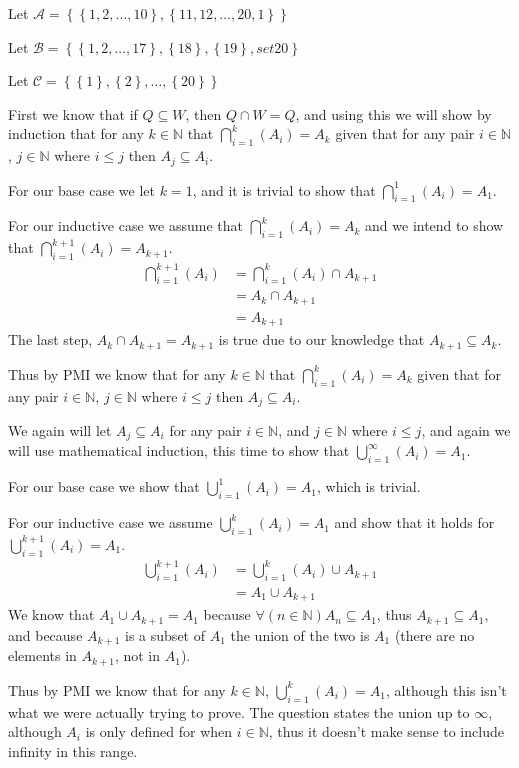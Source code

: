 \documentclass{article}
\let\union\cup
\let\inter\cap
\let\bigunion\bigcup
\let\biginter\bigcap
\newcommand{\unionfrom}[3]{\bigunion\limits_{#1}^{#2} \left( {#3 } \right)}
\newcommand{\interfrom}[3]{\biginter\limits_{#1}^{#2} \left( {#3 } \right)}
\newcommand{\set}[1]{\left\{ {#1} \right\}}
\begin{document}
Let $\mathscr A = \set{ \set{1, 2, \ldots, 10 }, \set{11, 12, \ldots, 20, 1}}$
\medskip

Let $\mathscr B = \set{ \set{1, 2, \ldots, 17}, \set{18}, \set{19}, set{20} }$
\medskip

Let $\mathscr C = \set{ \set1, \set2, \ldots, \set{20} }$
\bigskip

First we know that if $Q \subseteq W$, then $Q \inter W = Q$, and using this we will show by induction that for any $k \in \mathbb N$ that $\interfrom{i=1}k{A_i}=A_k$ given that for any pair $i\in\mathbb N$, $j\in\mathbb N$ where $i\le j$ then $A_j \subseteq A_i$.

For our base case we let $k=1$, and it is trivial to show that $\interfrom{i=1}1{A_i}=A_1$.

For our inductive case we assume that $\interfrom{i=1}{k}{A_i}=A_{k}$ and we intend to show that $\interfrom{i=1}{k+1}{A_i}=A_{k+1}$.
\begin{align*}
\interfrom{i=1}{k+1}{A_i} &= \interfrom{i=1}{k}{A_i} \inter A_{k+1} \\
&= A_k \inter A_{k+1} \\
&= A_{k+1}
\end{align*}
The last step,  $A_k \inter A_{k+1} = A_{k+1}$ is true due to our knowledge that $A_{k+1} \subseteq A_k$.

Thus by PMI we know that for any $k \in \mathbb N$ that $\interfrom{i=1}k{A_i}=A_k$ given that for any pair $i\in\mathbb N$, $j\in\mathbb N$ where $i\le j$ then $A_j \subseteq A_i$.
\medskip

We again will let $A_j \subseteq A_i$ for any pair $i\in\mathbb N$, and $j\in\mathbb N$ where $i\le j$, and again we will use mathematical induction, this time to show that $\unionfrom{i=1}\infty{A_i}=A_1$.

For our base case we show that $\unionfrom{i=1}1{A_i}=A_1$, which is trivial.

For our inductive case we assume $\unionfrom{i=1}k{A_i}=A_1$ and show that it holds for $\unionfrom{i=1}{k+1}{A_i}=A_1$.
\begin{align*}
\unionfrom{i=1}{k+1}{A_i} &= \unionfrom{i=1}k{A_i} \union A_{k+1} \\
&= A_1 \union A_{k+1}
\end{align*}
We know that $ A_1 \union A_{k+1}=A_1$ because $\forall (n \in \mathbb N) A_n \subseteq A_1$, thus $A_{k+1}\subseteq A_1$, and because $A_{k+1}$ is a subset of $A_1$ the union of the two is $A_1$ (there are no elements in $A_{k+1}$, not in $A_1$).

Thus by PMI we know that for any $k\in\mathbb N$, $\unionfrom{i=1}k{A_i}=A_1$, although this isn't what we were actually trying to prove. The question states the union up to $\infty$, although $A_i$ is only defined for when $i \in \mathbb N$, thus it doesn't make sense to include infinity in this range.
\end{document}
